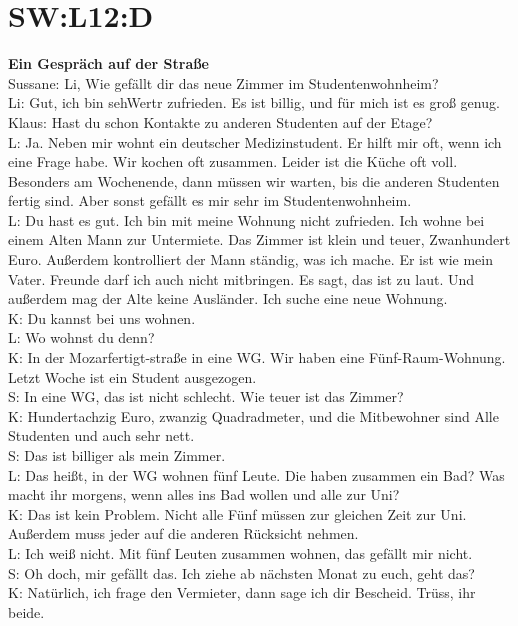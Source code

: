 \section{SW:L12:D}
\noindent
\textbf{Ein Gespräch auf der Straße} \\
Sussane: Li, Wie gefällt dir das neue Zimmer im Studentenwohnheim? \\
Li: Gut, ich bin sehWertr zufrieden. 
Es ist billig, und für mich ist es groß genug.  \\
Klaus: Hast du schon Kontakte zu anderen Studenten auf der Etage? \\
L: Ja. Neben mir wohnt ein deutscher Medizinstudent. 
Er hilft mir oft, wenn ich eine Frage habe. Wir kochen oft zusammen.
Leider ist die Küche oft voll. Besonders am Wochenende,
dann müssen wir warten, bis die anderen Studenten fertig sind.
Aber sonst gefällt es mir sehr im Studentenwohnheim. \\
L: Du hast es gut. Ich bin mit meine Wohnung nicht zufrieden.
Ich wohne bei einem Alten Mann zur Untermiete. Das Zimmer ist klein und teuer,
Zwanhundert Euro. Außerdem kontrolliert der Mann ständig, was ich mache.
Er ist wie mein Vater. Freunde darf ich auch nicht mitbringen. Es sagt, das ist zu laut.
Und außerdem mag der Alte keine Ausländer. Ich suche eine neue Wohnung. \\
K: Du kannst bei uns wohnen. \\
L: Wo wohnst du denn? \\
K: In der Mozarfertigt-straße in eine WG. Wir haben eine Fünf-Raum-Wohnung.
Letzt Woche ist ein Student ausgezogen. \\
S: In eine WG, das ist nicht schlecht. Wie teuer ist das Zimmer? \\
K: Hundertachzig Euro, zwanzig Quadradmeter, und die Mitbewohner sind Alle Studenten und auch sehr nett. \\
S: Das ist billiger als mein Zimmer. \\
L: Das heißt, in der WG wohnen fünf Leute. Die haben zusammen ein Bad?
Was macht ihr morgens, wenn alles ins Bad wollen und alle zur Uni?\\
K: Das ist kein Problem. Nicht alle Fünf müssen zur gleichen Zeit zur Uni. 
Außerdem muss jeder auf die anderen Rücksicht nehmen.  \\
L: Ich weiß nicht. Mit fünf Leuten zusammen wohnen, das gefällt mir nicht. \\
S: Oh doch, mir gefällt das. Ich ziehe ab nächsten Monat zu euch, geht das? \\
K: Natürlich, ich frage den Vermieter, dann sage ich dir Bescheid. Trüss, ihr beide. \\

